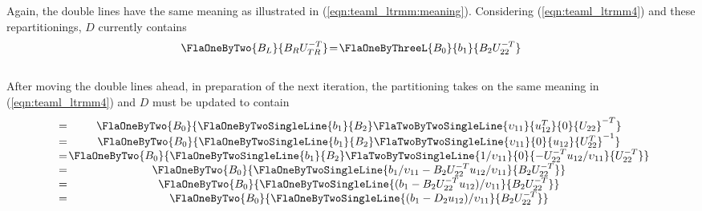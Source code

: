 Again, the double lines have the same meaning as illustrated
in (\ref{eqn:teaml_ltrmm:meaning}). Considering (\ref{eqn:teaml_ltrmm4}) and these repartitionings,
$ D $ currently contains
\begin{eqnarray*}
\begin{array}{c @{\hspace{1pt}} c @{\hspace{1pt}} c} 
\FlaOneByTwo{ B_{L} }
            { B_R U_{TR}^{-T} }
&=& 
\FlaOneByThreeL{ B_{0} }
               { b_{1} }
	       { B_{2} U_{22}^{-T} } \\      
\end{array}
\end{eqnarray*}
\\
After moving the double lines ahead, in preparation
of the next iteration, the partitioning takes on the same
meaning in (\ref{eqn:teaml_ltrmm4}) and $ D $ must be updated to contain 
\begin{eqnarray*}
\begin{array}{c @{\hspace{1pt}} c @{\hspace{1pt}} c @{\hspace{1pt}} c @{\hspace{1pt}} c}
&=& 
\FlaOneByTwo { 
	       B_{0} }
             { 
               \FlaOneByTwoSingleLine { b_{1} } { B_{2} }
	       \FlaTwoByTwoSingleLine { \upsilon_{11} } { u_{12}^{T} }
                                      {    0          } { U_{22}     }^{-T}
              } \\
&=& 
\FlaOneByTwo { 
	       B_{0} }
             { 
               \FlaOneByTwoSingleLine { b_{1} } { B_{2} }
	       \FlaTwoByTwoSingleLine { \upsilon_{11} } {     0      }
                                      { u_{12}        } { U_{22}^{T} }^{-1}
              } \\
&=& 
\FlaOneByTwo { 
	       B_{0} }
             { 
               \FlaOneByTwoSingleLine { b_{1} } { B_{2} }
	       \FlaTwoByTwoSingleLine { 1/\upsilon_{11}                     } {     0      }
                                      { -U_{22}^{-T} u_{12} / \upsilon_{11} } { U_{22}^{-T}}
              } \\
&=&
\FlaOneByTwo { 
	       B_{0} }
             { 
               \FlaOneByTwoSingleLine { b_{1} / \upsilon_{11} - B_{2} U_{22}^{-T} u_{12} / \upsilon_{11} } { B_{2} U_{22}^{-T} }
              } \\
&=&
\FlaOneByTwo { 
	       B_{0} }
             { 
               \FlaOneByTwoSingleLine { ( b_{1} - B_{2} U_{22}^{-T} u_{12} ) / \upsilon_{11} } { B_{2} U_{22}^{-T} }
              } \\
&=&
\FlaOneByTwo { 
	       B_{0} }
             { 
               \FlaOneByTwoSingleLine { ( b_{1} - D_{2} u_{12} ) / \upsilon_{11} } { B_{2} U_{22}^{-T} }
              } \\
\end{array}
\end{eqnarray*}
